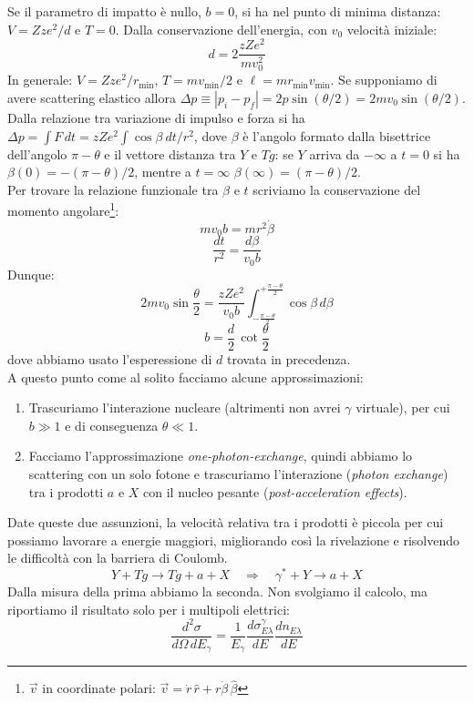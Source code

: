 \noindent Se il parametro di impatto è nullo, $b=0$, si ha nel punto di minima distanza: $V=Zz e^2 / d$ e $T=0$. Dalla conservazione dell'energia, con $v_0$ velocità iniziale:
$$d= 2\frac{zZe^2}{mv_0^2}$$
In generale: $V=Zz e^2 / r_{\min{}}$, $T=m v_{\min{}}/2$ e $\ell = m r_{\min{}}v_{\min{}}$. Se supponiamo di avere scattering elastico allora $\Delta p\equiv |p_i-p_f| = 2p \sin{(\theta/2)} = 2m v_0 \sin{(\theta/2)}$. Dalla relazione tra variazione di impulso e forza si ha $\Delta p = \int F\, dt = zZ e^2\int \cos{\beta}\: dt/r^2 $, dove $\beta$ è l'angolo formato dalla bisettrice dell'angolo $\pi - \theta$ e il vettore distanza tra $Y$ e $Tg$:  se $Y$ arriva da $-\infty$ a $t=0$ si ha $\beta(0) = - (\pi-\theta)/2$, mentre a $t=\infty$ $\beta(\infty) = (\pi-\theta)/2$.\\
Per trovare la relazione funzionale tra $\beta$ e $t$ scriviamo la conservazione del momento angolare\footnote{$\vec{v}$ in coordinate polari: $\vec{v} = \dot{r}\, \hat{r} + r \dot{\beta}\, \hat{\beta}$}:
$$m v_0 b = m r^2 \dot{\beta} $$
$$\frac{dt}{r^2} = \frac{d\beta}{v_0b}$$
Dunque:
$$2mv_0 \sin{\frac{\theta}{2}} = \frac{zZe^2}{v_0 b} \int_{-\frac{\pi-\theta}{2}}^{+\frac{\pi-\theta}{2}} \cos{\beta} \, d\beta$$
$$b = \frac{d}{2}\, \cot{\frac{\theta}{2}}$$
dove abbiamo usato l'esperessione di $d$ trovata in precedenza.\\
A questo punto come al solito facciamo alcune approssimazioni:
\begin{enumerate}
	\item Trascuriamo l'interazione nucleare (altrimenti non avrei $\gamma$ virtuale), per cui $b\gg1$ e di conseguenza $\theta\ll1$.
	\item Facciamo l'approssimazione \textit{one-photon-exchange}, quindi abbiamo lo scattering con un solo fotone e trascuriamo l'interazione (\textit{photon exchange}) tra i prodotti $a$ e $X$ con il nucleo pesante (\textit{post-acceleration effects}).%
\end{enumerate}
\noindent Date queste due assunzioni, la velocità relativa tra i prodotti è piccola per cui possiamo lavorare a energie maggiori, migliorando così la rivelazione e risolvendo le difficoltà con la barriera di Coulomb.
$$Y + Tg \to Tg + a + X \quad \Rightarrow \quad \gamma^* + Y \to a + X$$
Dalla misura della prima abbiamo la seconda. Non svolgiamo il calcolo, ma riportiamo il risultato solo per i multipoli elettrici:
$$\frac{d^2\sigma}{d\Omega\, dE_\gamma} = \frac{1}{E_\gamma} \frac{d \sigma_{E\lambda}^\gamma}{dE} \frac{dn_{E\lambda}}{dE}$$ 
